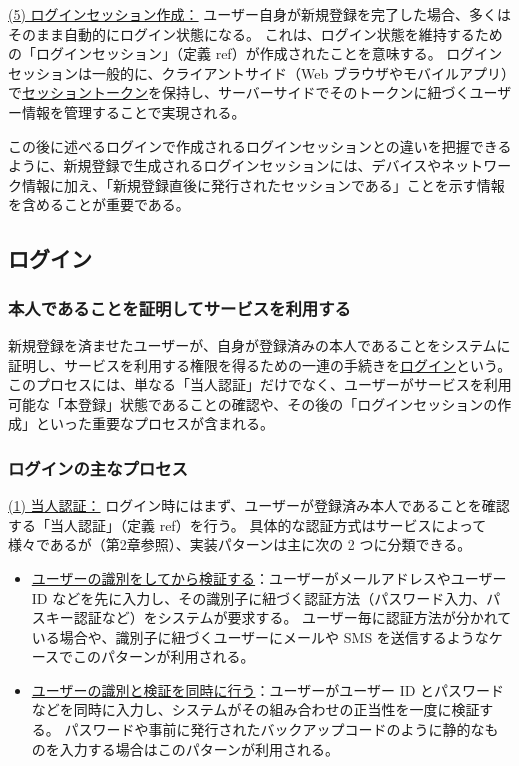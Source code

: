\documentclass[uplatex]{jsarticle}
\def\ref#1{ref}%
\def\label#1{}%
\begin{document}
\underline{(5) ログインセッション作成：}
ユーザー自身が新規登録を完了した場合、多くはそのまま自動的にログイン状態になる。
これは、ログイン状態を維持するための「ログインセッション」（定義 \ref{dfn:login-session}）が作成されたことを意味する。
ログインセッションは一般的に、クライアントサイド（Web ブラウザやモバイルアプリ）で\underline{セッショントークン}を保持し、サーバーサイドでそのトークンに紐づくユーザー情報を管理することで実現される。

この後に述べるログインで作成されるログインセッションとの違いを把握できるように、新規登録で生成されるログインセッションには、デバイスやネットワーク情報に加え、「新規登録直後に発行されたセッションである」ことを示す情報を含めることが重要である。

\subsection{ログイン}

\subsubsection{本人であることを証明してサービスを利用する}

\begin{dfn}[ログイン]\label{dfn:login}
新規登録を済ませたユーザーが、自身が登録済みの本人であることをシステムに証明し、サービスを利用する権限を得るための一連の手続きを\underline{ログイン}という。
このプロセスには、単なる「当人認証」だけでなく、ユーザーがサービスを利用可能な「本登録」状態であることの確認や、その後の「ログインセッションの作成」といった重要なプロセスが含まれる。
\end{dfn}

\subsubsection{ログインの主なプロセス}

\underline{(1) 当人認証：}
ログイン時にはまず、ユーザーが登録済み本人であることを確認する「当人認証」（定義 \ref{dfn:authentication}）を行う。
具体的な認証方式はサービスによって様々であるが（第2章参照）、実装パターンは主に次の 2 つに分類できる。

\begin{dfn}[当人認証の実装パターン]\label{dfn:ch3-login-auth-patterns}
\begin{itemize}
\item \underline{ユーザーの識別をしてから検証する}：ユーザーがメールアドレスやユーザー ID などを先に入力し、その識別子に紐づく認証方法（パスワード入力、パスキー認証など）をシステムが要求する。
ユーザー毎に認証方法が分かれている場合や、識別子に紐づくユーザーにメールや SMS を送信するようなケースでこのパターンが利用される。
\item \underline{ユーザーの識別と検証を同時に行う}：ユーザーがユーザー ID とパスワードなどを同時に入力し、システムがその組み合わせの正当性を一度に検証する。
パスワードや事前に発行されたバックアップコードのように静的なものを入力する場合はこのパターンが利用される。
\end{itemize}
\end{dfn}
\end{document}
